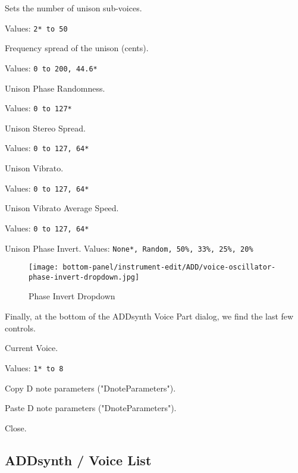    \setcounter{ItemCounter}{0}      %

   Sets the number of unison sub-voices.

   Values: \texttt{2* to 50}

   Frequency spread of the unison (cents).

   Values: \texttt{0 to 200, 44.6*}

   Unison Phase Randomness.

   Values: \texttt{0 to 127*}

   Unison Stereo Spread.

   Values: \texttt{0 to 127, 64*}

   Unison Vibrato.

   Values: \texttt{0 to 127, 64*}

   Unison Vibrato Average Speed.

   Values: \texttt{0 to 127, 64*}

   Unison Phase Invert.
   Values: \texttt{None*, Random, 50\%, 33\%, 25\%, 20\%}

\begin{figure}[H]
   \centering 
   \texttt{[image: bottom-panel/instrument-edit/ADD/voice-oscillator-phase-invert-dropdown.jpg]}
   \caption{Phase Invert Dropdown}
   \label{fig:phase_invert_dropdown}
\end{figure}

   Finally, at the bottom of the ADDsynth Voice Part dialog, we find the
   last few controls.

   \setcounter{ItemCounter}{0}      %

   Current Voice.

   Values: \texttt{1* to 8}

   Copy D note parameters ("DnoteParameters").

   Paste D note parameters ("DnoteParameters").

   Close.

\subsection{ADDsynth / Voice List}
\label{subsec:addsynth_voice_list}

